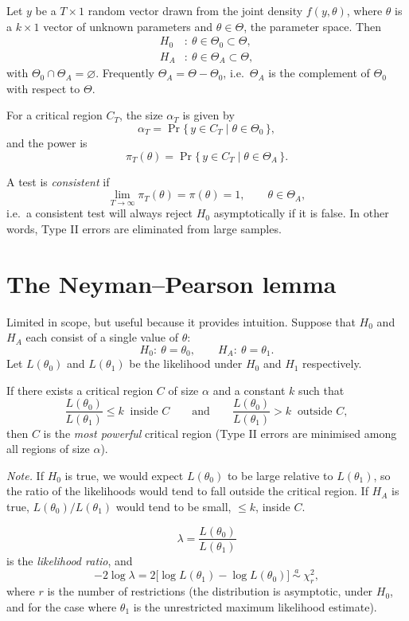 \documentclass[11pt]{article}
\begin{document}
Let $y$ be a $T\times1$ random vector drawn from the joint density $f(y,\theta)$, where $\theta$ is a
$k\times1$ vector of unknown parameters and $\theta\in\Theta$, the parameter space. Then
\begin{align*}
 H_{0}&:\ \theta\in\Theta_{0}\subset\Theta,\\
 H_{A}&:\ \theta\in\Theta_{A}\subset\Theta,
\end{align*}
with $\Theta_{0}\cap\Theta_{A}=\varnothing$. Frequently $\Theta_{A}=\Theta-\Theta_{0}$, i.e.\ $\Theta_{A}$ is
the complement of $\Theta_{0}$ with respect to $\Theta$.

For a critical region $C_{T}$, the size $\alpha_{T}$ is given by
\[ \alpha_{T}=\Pr\{\,y\in C_{T}\mid\theta\in\Theta_{0}\,\}, \]
and the power is
\[ \pi_{T}(\theta)=\Pr\{\,y\in C_{T}\mid\theta\in\Theta_{A}\,\}. \]

A test is \emph{consistent} if
\[ \lim_{T\to\infty}\pi_{T}(\theta)=\pi(\theta)=1,\qquad\theta\in\Theta_{A}, \]
i.e.\ a consistent test will always reject $H_{0}$ asymptotically if it is false. In other words,
Type II errors are eliminated from large samples.

\section{The Neyman--Pearson lemma}

Limited in scope, but useful because it provides intuition. Suppose that $H_{0}$ and $H_{A}$ each
consist of a single value of $\theta$:
\[ H_{0}:\ \theta=\theta_{0},\qquad H_{A}:\ \theta=\theta_{1}. \]
Let $L(\theta_{0})$ and $L(\theta_{1})$ be the likelihood under $H_{0}$ and $H_{1}$ respectively.

If there exists a critical region $C$ of size $\alpha$ and a constant $k$ such that
\[ \frac{L(\theta_{0})}{L(\theta_{1})}\le k\ \text{ inside }C
   \qquad\text{and}\qquad
   \frac{L(\theta_{0})}{L(\theta_{1})}>k\ \text{ outside }C, \]
then $C$ is the \emph{most powerful} critical region (Type II errors are minimised among all
regions of size $\alpha$).

\emph{Note.} If $H_{0}$ is true, we would expect $L(\theta_{0})$ to be large relative to $L(\theta_{1})$,
so the ratio of the likelihoods would tend to fall outside the critical region. If $H_{A}$ is true,
$L(\theta_{0})/L(\theta_{1})$ would tend to be small, $\le k$, inside $C$.

\[ \lambda=\frac{L(\theta_{0})}{L(\theta_{1})} \]
is the \emph{likelihood ratio}, and
\[ -2\log\lambda=2\bigl[\log L(\theta_{1})-\log L(\theta_{0})\bigr]\ \overset{a}{\sim}\ \chi^{2}_{r}, \]
where $r$ is the number of restrictions (the distribution is asymptotic, under $H_{0}$, and for the
case where $\theta_{1}$ is the unrestricted maximum likelihood estimate).
\end{document}
